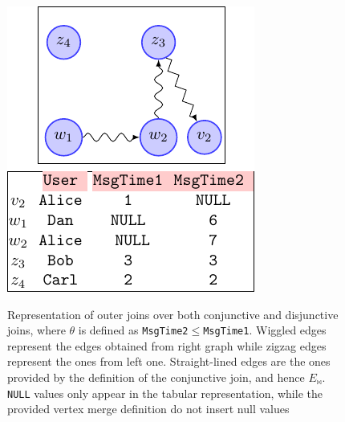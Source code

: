 \begin{figure}[!ph]
\begin{minipage}[b]{.35\linewidth}
		\includegraphics[scale=0.8]{fig/03joins/diff_both}
		\label{fig:diff_both}
	\end{minipage}
	\caption{Representation of outer joins over both conjunctive and disjunctive joins, where $\theta$ is defined as
		\texttt{MsgTime2$\leq$MsgTime1}. Wiggled edges represent the edges obtained from right graph while zigzag edges represent the ones from left one. Straight-lined edges are
		the ones provided by the definition of the conjunctive join, and hence $E_{\Join}$. \texttt{NULL} values only
		appear in the tabular representation, while the provided vertex merge definition do not insert null values}
	\label{fig:dataexampleouters}
\end{figure}

